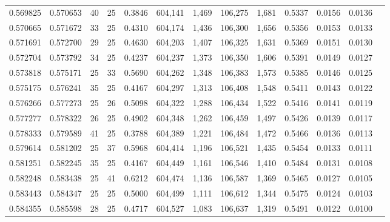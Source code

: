 \begin{tabular}{rrrrrrrrrrrrr}
0.569825 & 0.570653 &    40 &  25 &                                     0.3846 & 604,141 &   1,469 & 106,275 &   1,681 & 0.5337 & 0.0156 & 0.0136 \\
0.570665 & 0.571672 &    33 &  25 &                                     0.4310 & 604,174 &   1,436 & 106,300 &   1,656 & 0.5356 & 0.0153 & 0.0133 \\
0.571691 & 0.572700 &    29 &  25 &                                     0.4630 & 604,203 &   1,407 & 106,325 &   1,631 & 0.5369 & 0.0151 & 0.0130 \\
0.572704 & 0.573792 &    34 &  25 &                                     0.4237 & 604,237 &   1,373 & 106,350 &   1,606 & 0.5391 & 0.0149 & 0.0127 \\
0.573818 & 0.575171 &    25 &  33 &                                     0.5690 & 604,262 &   1,348 & 106,383 &   1,573 & 0.5385 & 0.0146 & 0.0125 \\
0.575175 & 0.576241 &    35 &  25 &                                     0.4167 & 604,297 &   1,313 & 106,408 &   1,548 & 0.5411 & 0.0143 & 0.0122 \\
0.576266 & 0.577273 &    25 &  26 &                                     0.5098 & 604,322 &   1,288 & 106,434 &   1,522 & 0.5416 & 0.0141 & 0.0119 \\
0.577277 & 0.578322 &    26 &  25 &                                     0.4902 & 604,348 &   1,262 & 106,459 &   1,497 & 0.5426 & 0.0139 & 0.0117 \\
0.578333 & 0.579589 &    41 &  25 &                                     0.3788 & 604,389 &   1,221 & 106,484 &   1,472 & 0.5466 & 0.0136 & 0.0113 \\
0.579614 & 0.581202 &    25 &  37 &                                     0.5968 & 604,414 &   1,196 & 106,521 &   1,435 & 0.5454 & 0.0133 & 0.0111 \\
0.581251 & 0.582245 &    35 &  25 &                                     0.4167 & 604,449 &   1,161 & 106,546 &   1,410 & 0.5484 & 0.0131 & 0.0108 \\
0.582248 & 0.583438 &    25 &  41 &                                     0.6212 & 604,474 &   1,136 & 106,587 &   1,369 & 0.5465 & 0.0127 & 0.0105 \\
0.583443 & 0.584347 &    25 &  25 &                                     0.5000 & 604,499 &   1,111 & 106,612 &   1,344 & 0.5475 & 0.0124 & 0.0103 \\
0.584355 & 0.585598 &    28 &  25 &                                     0.4717 & 604,527 &   1,083 & 106,637 &   1,319 & 0.5491 & 0.0122 & 0.0100 \\

\end{tabular}
